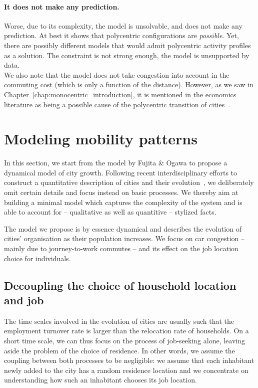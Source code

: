 \paragraph{It does not make any prediction.} Worse, due to its complexity, the
model is unsolvable, and does not make any prediction. At best it shows that
polycentric configurations are \emph{possible}. Yet, there are possibly
different models that would admit polycentric activity profiles as a solution.
The constraint is not strong enough, the model is unsupported by data.\\ 

We also note that the model does not take congestion into account in the
commuting cost (which is only a function of the distance). However, as we saw in
Chapter~\ref{chap:monocentric_introduction}, it is
mentioned in the economics literature as being a possible cause of the
polycentric transition of cities~\cite{McMillen:2003}. 


\section{Modeling mobility patterns}
\label{sec:an_out_of_equilibrium_model_}

In this section, we start from the model by Fujita \& Ogawa to propose a
dynamical model of city growth. Following recent interdisciplinary efforts to
construct a quantitative description of cities and their
evolution~\cite{Makse:1995,Zanette:1997,Marsili:1998,Bettencourt:2007,Batty:2008},
we deliberately omit certain details and focus instead on basic processes. We
thereby aim at building a minimal model which captures the complexity of the
system and is able to account for -- qualitative as well as quantitive -- stylized
facts.  

The model we propose is by essence dynamical and describes the evolution
of cities' organisation as their population increases. We focus on car
congestion -- mainly due to journey-to-work commutes -- and its effect on the
job location choice for individuals.\\

\subsection{Decoupling the choice of household location and job}
\label{sub:decoupling_the_choice_of_household_and_job}

The time scales involved in the evolution of cities are usually such that the
employment turnover rate is larger than the relocation rate of households. On a
short time scale, we can thus focus on the process of job-seeking alone, leaving
aside the problem of the choice of residence. In other words, we assume the
coupling between both processes to be negligible: we assume that each inhabitant
newly added to the city has a random residence location and we concentrate on
understanding how such an inhabitant chooses its job location.\\

